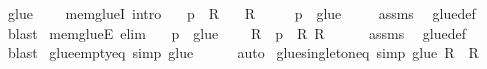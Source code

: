 \begin{isabellebody}
\ {\isachardoublequoteopen}glue\ {\isasymR}\ {\isasymequiv}\ {\isasymUnion}{\isasymR}{\isachardoublequoteclose}\isanewline
\isanewline
{}\isamarkupfalse%
\ mem{\isacharunderscore}{\kern0pt}glueI\ {\isacharbrackleft}{\kern0pt}intro{\isacharbrackright}{\kern0pt}{\isacharcolon}{\kern0pt}\isanewline
\ \ \ {\isachardoublequoteopen}p\ {\isasymin}\ R{\isachardoublequoteclose}\isanewline
\ \ \ {\isachardoublequoteopen}R\ {\isasymin}\ {\isasymR}{\isachardoublequoteclose}\isanewline
\ \ \ {\isachardoublequoteopen}p\ {\isasymin}\ glue\ {\isasymR}{\isachardoublequoteclose}\isanewline
%
\isadelimproof
\ \ %
\endisadelimproof
%
\isatagproof
{}\isamarkupfalse%
\ assms\ \isamarkupfalse%
\ glue{\isacharunderscore}{\kern0pt}def\ \isamarkupfalse%
\ blast%
\endisatagproof
{\isafoldproof}%
%
\isadelimproof
\isanewline
%
\endisadelimproof
\isanewline
{}\isamarkupfalse%
\ mem{\isacharunderscore}{\kern0pt}glueE\ {\isacharbrackleft}{\kern0pt}elim{\isacharbang}{\kern0pt}{\isacharbrackright}{\kern0pt}{\isacharcolon}{\kern0pt}\isanewline
\ \ \ {\isachardoublequoteopen}p\ {\isasymin}\ glue\ {\isasymR}{\isachardoublequoteclose}\isanewline
\ \ \ R\ \ {\isachardoublequoteopen}p\ {\isasymin}\ R{\isachardoublequoteclose}\ {\isachardoublequoteopen}R\ {\isasymin}\ {\isasymR}{\isachardoublequoteclose}\isanewline
%
\isadelimproof
\ \ %
\endisadelimproof
%
\isatagproof
{}\isamarkupfalse%
\ assms\ \isamarkupfalse%
\ glue{\isacharunderscore}{\kern0pt}def\ \isamarkupfalse%
\ blast%
\endisatagproof
{\isafoldproof}%
%
\isadelimproof
\isanewline
%
\endisadelimproof
\isanewline
{}\isamarkupfalse%
\ glue{\isacharunderscore}{\kern0pt}empty{\isacharunderscore}{\kern0pt}eq\ {\isacharbrackleft}{\kern0pt}simp{\isacharbrackright}{\kern0pt}{\isacharcolon}{\kern0pt}\ {\isachardoublequoteopen}glue\ {\isacharbraceleft}{\kern0pt}{\isacharbraceright}{\kern0pt}\ {\isacharequal}{\kern0pt}\ {\isacharbraceleft}{\kern0pt}{\isacharbraceright}{\kern0pt}{\isachardoublequoteclose}%
\isadelimproof
\ %
\endisadelimproof
%
\isatagproof
{}\isamarkupfalse%
\ auto%
\endisatagproof
{\isafoldproof}%
%
\isadelimproof
%
\endisadelimproof
\isanewline
\isanewline
{}\isamarkupfalse%
\ glue{\isacharunderscore}{\kern0pt}singleton{\isacharunderscore}{\kern0pt}eq\ {\isacharbrackleft}{\kern0pt}simp{\isacharbrackright}{\kern0pt}{\isacharcolon}{\kern0pt}\ {\isachardoublequoteopen}glue\ {\isacharbraceleft}{\kern0pt}R{\isacharbraceright}{\kern0pt}\ {\isacharequal}{\kern0pt}\ R{\isachardoublequoteclose}%

\end{isabellebody}
